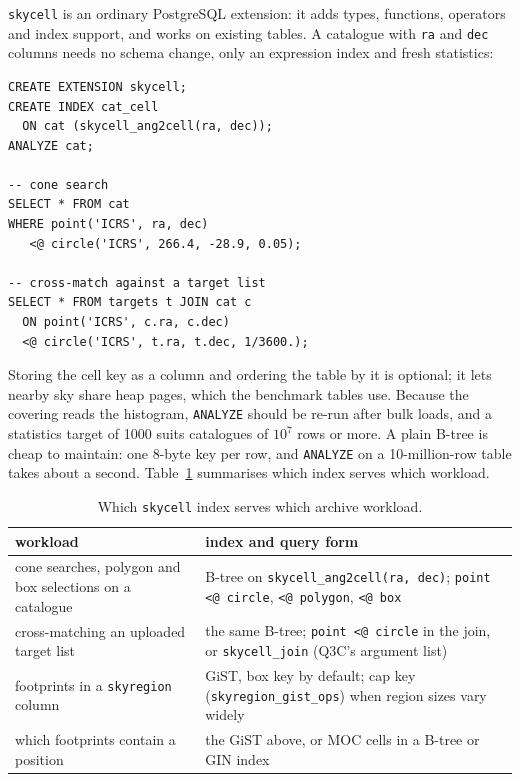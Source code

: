\documentclass[final,5p,times,twocolumn,authoryear]{elsarticle}
\begin{document}
\texttt{skycell} is an ordinary PostgreSQL extension: it adds types, functions,
operators and index support, and works on existing tables. A catalogue with
\texttt{ra} and \texttt{dec} columns needs no schema change, only an expression index
and fresh statistics:
{\footnotesize
\begin{verbatim}
CREATE EXTENSION skycell;
CREATE INDEX cat_cell
  ON cat (skycell_ang2cell(ra, dec));
ANALYZE cat;

-- cone search
SELECT * FROM cat
WHERE point('ICRS', ra, dec)
   <@ circle('ICRS', 266.4, -28.9, 0.05);

-- cross-match against a target list
SELECT * FROM targets t JOIN cat c
  ON point('ICRS', c.ra, c.dec)
  <@ circle('ICRS', t.ra, t.dec, 1/3600.);
\end{verbatim}}
\noindent Storing the cell key as a column and ordering the table by it is optional; it lets
nearby sky share heap pages, which the benchmark tables use. Because the covering reads
the histogram, \texttt{ANALYZE} should be re-run after bulk loads, and a statistics
target of 1000 suits catalogues of $10^7$ rows or more. A plain B-tree is cheap to
maintain: one 8-byte key per row, and \texttt{ANALYZE} on a 10-million-row table takes
about a second. Table~\ref{tab:workloads} summarises which index serves which workload.

\begin{table}
  \caption{Which \texttt{skycell} index serves which archive workload.}
  \label{tab:workloads}
  \centering
  \footnotesize
  \begin{tabular}{@{}p{} p{}@{}}
    \hline\hline
    workload & index and query form \\
    \hline
    cone searches, polygon and box selections on a catalogue &
      B-tree on \texttt{skycell\_ang2cell(ra, dec)}; \texttt{point <@ circle},
      \texttt{<@ polygon}, \texttt{<@ box} \\[2pt]
    cross-matching an uploaded target list &
      the same B-tree; \texttt{point <@ circle} in the join, or
      \texttt{skycell\_join} (Q3C's argument list) \\[2pt]
    footprints in a \texttt{skyregion} column &
      GiST, box key by default; cap key (\texttt{skyregion\_gist\_ops}) when region
      sizes vary widely \\[2pt]
    which footprints contain a position &
      the GiST above, or MOC cells in a B-tree or GIN index \\
    \hline
  \end{tabular}
\end{table}
\end{document}
